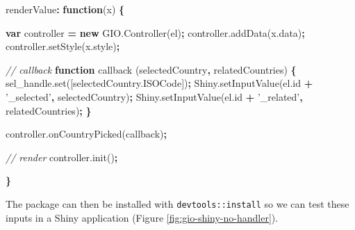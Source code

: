 \documentclass[10pt,]{krantz}
\makeatletter
\newenvironment{Shaded}{\begin{snugshade}}{\end{snugshade}}
\newcommand{\AttributeTok}[1]{\textcolor[rgb]{0.61,0.61,0.61}{#1}}
\newcommand{\CommentTok}[1]{\textcolor[rgb]{0.37,0.37,0.37}{\textit{#1}}}
\newcommand{\KeywordTok}[1]{\textcolor[rgb]{0.27,0.27,0.27}{\textbf{#1}}}
\newcommand{\NormalTok}[1]{#1}
\newcommand{\OperatorTok}[1]{\textcolor[rgb]{0.43,0.43,0.43}{\textbf{#1}}}
\newcommand{\StringTok}[1]{\textcolor[rgb]{0.5,0.5,0.5}{#1}}
\newcommand{\VariableTok}[1]{\textcolor[rgb]{0,0,0}{#1}}
\newenvironment{kframe}{%
\medskip{}
\setlength{\fboxsep}{.8em}
 \def\at@end@of@kframe{}%
 \ifinner\ifhmode%
  \def\at@end@of@kframe{\end{minipage}}%
  \begin{minipage}{\columnwidth}%
 \fi\fi%
 \def\FrameCommand##1{\hskip\@totalleftmargin \hskip-\fboxsep
 \colorbox{shadecolor}{##1}\hskip-\fboxsep
     \hskip-\linewidth \hskip-\@totalleftmargin \hskip\columnwidth}%
 \MakeFramed {\advance\hsize-\width
   \@totalleftmargin\z@ \linewidth\hsize
   \@setminipage}}%
 {\par\unskip\endMakeFramed%
 \at@end@of@kframe}
\renewenvironment{Shaded}{\begin{kframe}}{\end{kframe}}
\makeatother
\begin{document}
\begin{Shaded}
\begin{Highlighting}[]
\NormalTok{renderValue}\OperatorTok{:} \KeywordTok{function}\NormalTok{(x) }\OperatorTok{\{}

  \KeywordTok{var}\NormalTok{ controller }\OperatorTok{=} \KeywordTok{new} \VariableTok{GIO}\NormalTok{.}\AttributeTok{Controller}\NormalTok{(el)}\OperatorTok{;}
  \VariableTok{controller}\NormalTok{.}\AttributeTok{addData}\NormalTok{(}\VariableTok{x}\NormalTok{.}\AttributeTok{data}\NormalTok{)}\OperatorTok{;}
  \VariableTok{controller}\NormalTok{.}\AttributeTok{setStyle}\NormalTok{(}\VariableTok{x}\NormalTok{.}\AttributeTok{style}\NormalTok{)}\OperatorTok{;}

  \CommentTok{// callback}
  \KeywordTok{function} \AttributeTok{callback}\NormalTok{ (selectedCountry}\OperatorTok{,}\NormalTok{ relatedCountries) }\OperatorTok{\{}
    \VariableTok{sel_handle}\NormalTok{.}\AttributeTok{set}\NormalTok{([}\VariableTok{selectedCountry}\NormalTok{.}\AttributeTok{ISOCode}\NormalTok{])}\OperatorTok{;}
    \VariableTok{Shiny}\NormalTok{.}\AttributeTok{setInputValue}\NormalTok{(}\VariableTok{el}\NormalTok{.}\AttributeTok{id} \OperatorTok{+} \StringTok{'_selected'}\OperatorTok{,}\NormalTok{ selectedCountry)}\OperatorTok{;}
    \VariableTok{Shiny}\NormalTok{.}\AttributeTok{setInputValue}\NormalTok{(}\VariableTok{el}\NormalTok{.}\AttributeTok{id} \OperatorTok{+} \StringTok{'_related'}\OperatorTok{,}\NormalTok{ relatedCountries)}\OperatorTok{;}
  \OperatorTok{\}}

  \VariableTok{controller}\NormalTok{.}\AttributeTok{onCountryPicked}\NormalTok{(callback)}\OperatorTok{;}

  \CommentTok{// render}
  \VariableTok{controller}\NormalTok{.}\AttributeTok{init}\NormalTok{()}\OperatorTok{;}

\OperatorTok{\}}
\end{Highlighting}
\end{Shaded}

The package can then be installed with \texttt{devtools::install} so we can test these inputs in a Shiny application (Figure \ref{fig:gio-shiny-no-handler}).
\end{document}
